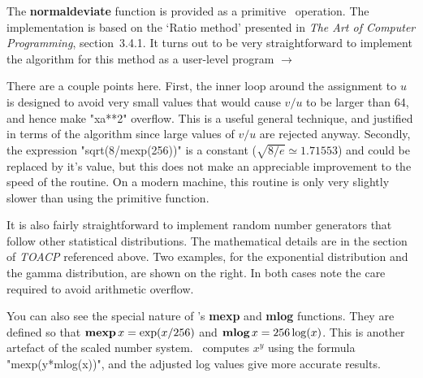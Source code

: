\documentclass[a4paper,landscape]{article}
\def\kw#1{\begingroup\def\_{\kern.04em
    \vbox{\hrule width.3em height .6pt}\kern.08em}%
\ifmmode\mathop{\textbf{#1}}\else\hbox{\bf#1\/}\fi\endgroup}
\begin{document}
The \kw{normaldeviate} function is provided as a primitive \MP\ operation. The
implementation is based on the `Ratio method' presented in \textsl{The Art of
Computer Programming}, section~3.4.1.   It turns out to be very straightforward to
implement the algorithm for this method as a user-level program $\to$
%

There are a couple points here.  First, the inner loop around the assignment to $u$ is
designed to avoid very small values that would cause $v/u$ to be larger than 64, and
hence make "xa**2" overflow. This is a useful general technique, and justified in
terms of the algorithm since large values of $v/u$ are rejected anyway.  Secondly,
the expression "sqrt(8/mexp(256))" is a constant ($ \sqrt{8/e} \simeq 1.71553 $) and could be
replaced by it's value, but this does not make an appreciable improvement to the
speed of the routine.  On a modern machine, this routine is only very slightly
slower than using the primitive function.

It is also fairly straightforward to implement random number generators that follow other statistical
distributions.  The mathematical details are in the section of \textsl{TOACP}
referenced above. Two examples, for the exponential distribution and the gamma
distribution, are shown on the right.  In both cases note the care required to avoid
arithmetic overflow.  

\medskip\noindent
You can also see the special nature of \MP's \kw{mexp} and \kw{mlog}
functions. They are defined so that $\kw{mexp} x = \exp(x/256)$ and $\kw{mlog} x =256\log(x)$.
This is another artefact of the scaled number system.  \MP\ computes $x^y$ using the
formula "mexp(y*mlog(x))", and the adjusted log values give more accurate results.
\end{document}
